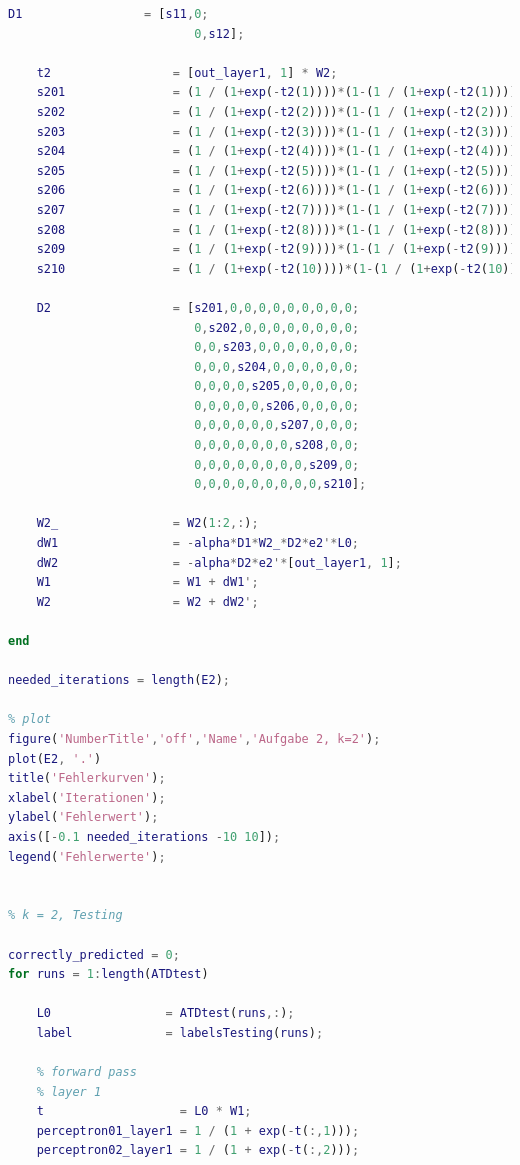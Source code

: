 \documentclass[12pt]{article}
\begin{document}
\begin{lstlisting}[language=Matlab]
    D1                 = [s11,0;
                          0,s12];
    
    t2                 = [out_layer1, 1] * W2;
    s201               = (1 / (1+exp(-t2(1))))*(1-(1 / (1+exp(-t2(1)))));
    s202               = (1 / (1+exp(-t2(2))))*(1-(1 / (1+exp(-t2(2)))));
    s203               = (1 / (1+exp(-t2(3))))*(1-(1 / (1+exp(-t2(3)))));
    s204               = (1 / (1+exp(-t2(4))))*(1-(1 / (1+exp(-t2(4)))));
    s205               = (1 / (1+exp(-t2(5))))*(1-(1 / (1+exp(-t2(5)))));
    s206               = (1 / (1+exp(-t2(6))))*(1-(1 / (1+exp(-t2(6)))));
    s207               = (1 / (1+exp(-t2(7))))*(1-(1 / (1+exp(-t2(7)))));
    s208               = (1 / (1+exp(-t2(8))))*(1-(1 / (1+exp(-t2(8)))));
    s209               = (1 / (1+exp(-t2(9))))*(1-(1 / (1+exp(-t2(9)))));
    s210               = (1 / (1+exp(-t2(10))))*(1-(1 / (1+exp(-t2(10)))));
    
    D2                 = [s201,0,0,0,0,0,0,0,0,0;
                          0,s202,0,0,0,0,0,0,0,0;
                          0,0,s203,0,0,0,0,0,0,0;
                          0,0,0,s204,0,0,0,0,0,0;
                          0,0,0,0,s205,0,0,0,0,0;
                          0,0,0,0,0,s206,0,0,0,0;
                          0,0,0,0,0,0,s207,0,0,0;
                          0,0,0,0,0,0,0,s208,0,0;
                          0,0,0,0,0,0,0,0,s209,0;
                          0,0,0,0,0,0,0,0,0,s210];
    
    W2_                = W2(1:2,:);
    dW1                = -alpha*D1*W2_*D2*e2'*L0;
    dW2                = -alpha*D2*e2'*[out_layer1, 1];
    W1                 = W1 + dW1';
    W2                 = W2 + dW2';

end

needed_iterations = length(E2);

% plot
figure('NumberTitle','off','Name','Aufgabe 2, k=2');
plot(E2, '.')
title('Fehlerkurven');
xlabel('Iterationen');
ylabel('Fehlerwert');
axis([-0.1 needed_iterations -10 10]);
legend('Fehlerwerte');


% k = 2, Testing

correctly_predicted = 0;
for runs = 1:length(ATDtest)
    
    L0                = ATDtest(runs,:);
    label             = labelsTesting(runs);
        
    % forward pass
    % layer 1
    t                   = L0 * W1;
    perceptron01_layer1 = 1 / (1 + exp(-t(:,1)));
    perceptron02_layer1 = 1 / (1 + exp(-t(:,2)));
    

\end{lstlisting}
\end{document}
